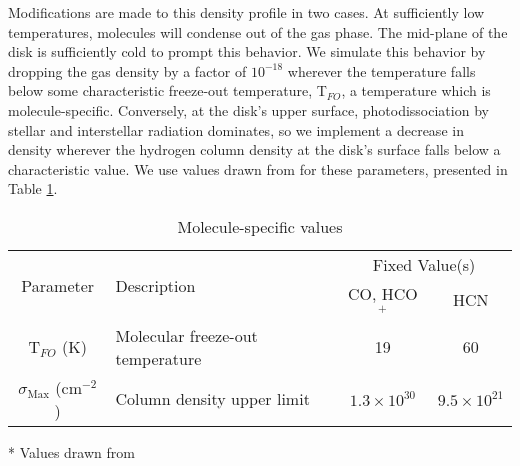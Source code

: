 
Modifications are made to this density profile in two cases. At sufficiently low temperatures, molecules will condense out of the gas phase. The mid-plane of the disk is sufficiently cold to prompt this behavior. We simulate this behavior by dropping the gas density by a factor of $10^{-18}$ wherever the temperature falls below some characteristic freeze-out temperature, T$_{FO}$, a temperature which is molecule-specific. Conversely, at the disk's upper surface, photodissociation by stellar and interstellar radiation dominates, so we implement a decrease in density wherever the hydrogen column density at the disk's surface falls below a characteristic value. We use values drawn from \cite{Factor2017} for these parameters, presented in Table \ref{tab:mol_specifics}.


\begin{table}
  \begin{threeparttable}
    \centering
    \caption{Molecule-specific values}
    \label{tab:mol_specifics}
    \renewcommand{\arraystretch}{1.2}
    \begin{tabular}{c  l  c c }
      \toprule \toprule
      \multirow{2}{*}{Parameter} & \multirow{2}{*}{Description}    & \multicolumn{2}{c}{Fixed Value(s)} \\
                                 &                                 & CO, HCO$^+$ & HCN \\
      \midrule %
      T$_{FO}$ (K)           &  Molecular freeze-out temperature   &  19 & 60    \\
      $\sigma_\text{Max}$ (cm$^{-2}$) & Column density upper limit &  $1.3 \times 10^{30}$ & $9.5 \times 10^{21}$  \\
      \bottomrule
    \end{tabular}
    \begin{tablenotes}\footnotesize
      \item[*] Values drawn from \cite{Factor2017}
    \end{tablenotes}
  \end{threeparttable}
\end{table}




